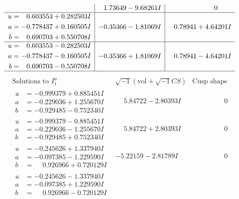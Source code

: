 \documentclass[1p]{elsarticle_modified}
\theoremstyle{definition}
\newcommand{\I}{\sqrt{-1}}
\begin{document}
$$\begin{array}{c|c|c}
 & \phantom{-}1.73649 - 9.68261 I & \phantom{-0.000000 } 0 \\ \hline\begin{aligned}
u &= \phantom{-}0.603553 + 0.282503 I \\
a &= -0.778437 + 0.160505 I \\
b &= \phantom{-}0.690703 + 0.550708 I\end{aligned}
 & -0.35366 - 1.81069 I & \phantom{-}0.78941 + 4.64201 I \\ \hline\begin{aligned}
u &= \phantom{-}0.603553 - 0.282503 I \\
a &= -0.778437 - 0.160505 I \\
b &= \phantom{-}0.690703 - 0.550708 I\end{aligned}
 & -0.35366 + 1.81069 I & \phantom{-}0.78941 - 4.64201 I\\
 \hline 
 \end{array}$$\newpage$$\begin{array}{c|c|c}  
\text{Solutions to }I^u_{1}& \I (\text{vol} + \sqrt{-1}CS) & \text{Cusp shape}\\
 \hline 
\begin{aligned}
u &= -0.999379 + 0.885451 I \\
a &= -0.229036 + 1.255670 I \\
b &= -0.929485 - 0.752340 I\end{aligned}
 & \phantom{-}5.84722 - 2.80393 I & \phantom{-0.000000 } 0 \\ \hline\begin{aligned}
u &= -0.999379 - 0.885451 I \\
a &= -0.229036 - 1.255670 I \\
b &= -0.929485 + 0.752340 I\end{aligned}
 & \phantom{-}5.84722 + 2.80393 I & \phantom{-0.000000 } 0 \\ \hline\begin{aligned}
u &= -0.245626 + 1.337940 I \\
a &= -0.097385 - 1.229590 I \\
b &= \phantom{-}0.926966 + 0.720129 I\end{aligned}
 & -5.22159 - 2.81789 I & \phantom{-0.000000 } 0 \\ \hline\begin{aligned}
u &= -0.245626 - 1.337940 I \\
a &= -0.097385 + 1.229590 I \\
b &= \phantom{-}0.926966 - 0.720129 I\end{aligned}

\end{array}$$
\end{document}
